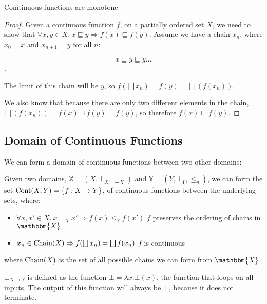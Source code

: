 \vspace{0.25cm}

\begin{thm}\label{mono}
Comtinuous functions are monotone
\end{thm}

\begin{proof}
Given a continuous function $f$, on a partially ordered set $X$, we need to show that $\forall x,y \in X. \ x \sqsubseteq y \Rightarrow f(x) \sqsubseteq f(y)$.
Assume we have a chain $x_n$, where $x_0 = x$ and $x_{n + 1} = y$ for all $n$:

\[x \sqsubseteq y \sqsubseteq y \dots \] .

The limit of this chain will be $y$, so $f(\bigsqcup x_n) = f(y) = \bigsqcup (f (x_n))$.

We also know that because there are only two different elements in the chain, $\bigsqcup (f (x_n)) = f(x) \sqcup f(y) = f(y)$, so therefore $f(x) \sqsubseteq f(y)$.

\end{proof}

\subsection{Domain of Continuous Functions}\label{cont}

We can form a domain of continuous functions between two other domains:

Given two domains, $\mathbb{X} = (X, \bot_X, \sqsubseteq_X)$ and $\mathbb{Y} = (Y, \bot_Y, \leq_y)$, we can form the set $\operatorname{Cont}(X,Y) =\{ f : X \to Y\}$, of continuous functions between the underlying sets, where:

\begin{itemize}
\item{$\forall x, x' \in X. \ x \sqsubseteq_X x' \Rightarrow f(x) \leq_Y f(x')$ \hspace{1cm} $f$ preserves the ordering of chains in $\mathbbm{X}$}
\item{$x_n \in \operatorname{Chain}(X) \Rightarrow f(\bigsqcup x_n) = \bigsqcup f(x_n)$ \hspace{2cm} $f$ is continuous}
\end{itemize} 

where $\operatorname{Chain}(X)$ is the set of all possible chains we can form from  $\mathbbm{X}$.

$\bot_{X \to Y}$ is defined as the function $\bot = \lambda x. \bot (x)$, the function that loops on all inputs. The output of this function will always be $\bot$, because it does not terminate. 

